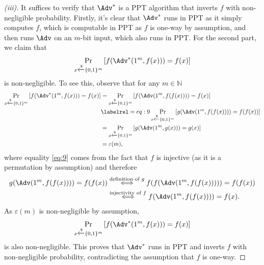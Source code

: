 \begin{proof}[(iii)]
    It suffices to verify that $\Adv^\ast$ is a PPT algorithm that inverts $f$ with non-negligible probability. Firstly, it's clear that $\Adv^\ast$ runs in PPT as it simply computes $f$, which is computable in PPT as $f$ is one-way by assumption, and then runs $\Adv$ on an $m$-bit input, which also runs in PPT. For the second part, we claim that
    \[
    \Pr_{x\xleftarrow{\$}\{0,1\}^m}\left[f(\Adv^\ast(1^m, f(x))) = f(x)\right]
    \]
    is non-negligible. To see this, observe that for any $m\in\mathbb{N}$
    \begin{align*}
        \Pr_{x\xleftarrow{\$}\{0,1\}^m}\left[f(\Adv^\ast(1^m, f(x))) = f(x)\right]
        &= \Pr_{x\xleftarrow{\$}\{0,1\}^m}\left[f(\Adv(1^{m}, f(f(x)))) = f(x)\right] \\
        &\labelrel={eq:9} \Pr_{x\xleftarrow{\$}\{0,1\}^m}\left[g(\Adv(1^{m}, f(f(x)))) = f(f(x))\right] \\
        &= \Pr_{x\xleftarrow{\$}\{0,1\}^m}\left[g(\Adv(1^{m}, g(x))) = g(x)\right] \\
        &= \varepsilon(m),
    \end{align*}
    where equality \eqref{eq:9} comes from the fact that $f$ is injective (as it is a permutation by assumption) and therefore
    \begin{align*}
    g(\Adv(1^{m}, f(f(x)))) = f(f(x))
    &\stackrel{\textrm{definition of } g}{\iff} f(f(\Adv(1^{m}, f(f(x))))) = f(f(x)) \\
    &\stackrel{\textrm{injectivity of } f}{\iff}  f(\Adv(1^{m}, f(f(x)))) = f(x).
    \end{align*}
    As $\varepsilon(m)$ is non-negligible by assumption,
    \[
    \Pr_{x\xleftarrow{\$}\{0,1\}^m}\left[f(\Adv^\ast(1^m, f(x))) = f(x)\right]
    \]
    is also non-negligible. This proves that $\Adv^\ast$ runs in PPT and inverts $f$ with non-negligible probability, contradicting the assumption that $f$ is one-way.
\end{proof}




